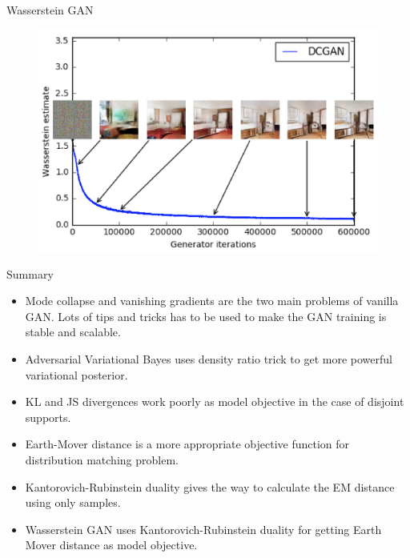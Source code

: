 \begin{frame}{Wasserstein GAN}
\begin{minipage}[t]{0.5\columnwidth}
\begin{figure}
		\end{figure}
	\end{minipage}%
	\begin{minipage}[t]{0.5\columnwidth}
		\begin{figure}
			\centering
			\includegraphics[width=1.0\linewidth]{figs/wgan_quality}
		\end{figure}
	\end{minipage}
	
\end{frame}
\begin{frame}{Summary}
	\begin{itemize}
		\item Mode collapse and vanishing gradients are the two main problems of vanilla GAN.  Lots of tips and tricks has to be used to make the GAN training is stable and scalable.
		\vfill
		\item Adversarial Variational Bayes uses density ratio trick to get more powerful variational posterior.
		\vfill
		\item KL and JS divergences work poorly as model objective in the case of disjoint supports.
		\vfill
		\item Earth-Mover distance is a more appropriate objective function for distribution matching problem.	
		\vfill
		\item Kantorovich-Rubinstein duality gives the way to calculate the EM distance using only samples.
		\vfill
		\item Wasserstein GAN uses Kantorovich-Rubinstein duality for getting Earth Mover distance as model objective.
	\end{itemize}
\end{frame}
 